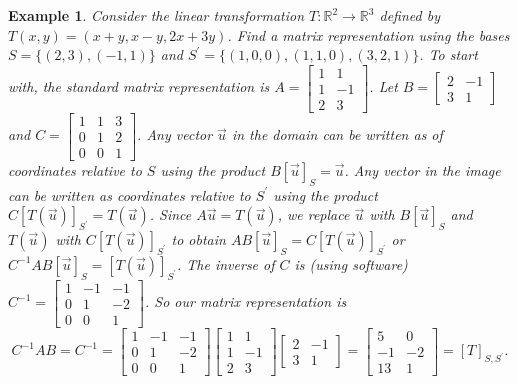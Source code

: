 \documentclass[10pt]{article}
\theoremstyle{plain}
\theoremstyle{box}
\newtheorem{example}{Example}
\begin{document}
\begin{example}
Consider the linear transformation $T:{\mathbb{R}}^2\to {\mathbb{R}}^3$ defined by $T(x,y)=(x+y,x-y,2x+3y)$. Find a matrix representation using the bases $S=\{(2,3),(-1,1)\}$ and $S^\prime=\{(1,0,0),(1,1,0),(3,2,1)\}$.  To start with, the standard matrix representation is 
$
A=
\begin{bmatrix}
 1 & 1 \\
 1 & -1 \\
 2 & 3
\end{bmatrix}
$. Let
$B=
\begin{bmatrix}
 2 & -1 \\
 3 & 1
\end{bmatrix}
$ and 
$
C=
\begin{bmatrix}
 1 & 1 & 3 \\
 0 & 1 & 2 \\
 0 & 0 & 1
\end{bmatrix}
$.
 Any vector $\vec u$ in the domain can be written as of coordinates relative to $S$ using the product $ B[\vec u]_S=\vec u$. Any vector in the image can be written as coordinates relative to $S^\prime$ using the product $C[T(\vec u)]_{S^\prime} = T(\vec u)$.  Since $A\vec u = T(\vec u)$, we replace $\vec u$ with $B[\vec u]_S$ and $T(\vec u)$ with $C[T(\vec u)]_{S^\prime}$ to obtain $AB[\vec u]_S = C[T(\vec u)]_{S^\prime}$ or $C^{-1}AB[\vec u]_S=[T(\vec u)]_{S^\prime}$.  The inverse of $C$ is (using software) 
$
C^{-1}=
\begin{bmatrix}
 1 & -1 & -1 \\
 0 & 1 & -2 \\
 0 & 0 & 1
\end{bmatrix}
$.  So our matrix representation is $$C^{-1}AB = 
C^{-1}=
\begin{bmatrix}
 1 & -1 & -1 \\
 0 & 1 & -2 \\
 0 & 0 & 1
\end{bmatrix}
\begin{bmatrix}
 1 & 1 \\
 1 & -1 \\
 2 & 3
\end{bmatrix}
\begin{bmatrix}
 2 & -1 \\
 3 & 1
\end{bmatrix}
=
\begin{bmatrix}
 5 & 0 \\
 -1 & -2 \\
 13 & 1
\end{bmatrix}=[T]_{S,S^\prime}.
$$

\end{example}
\end{document}
